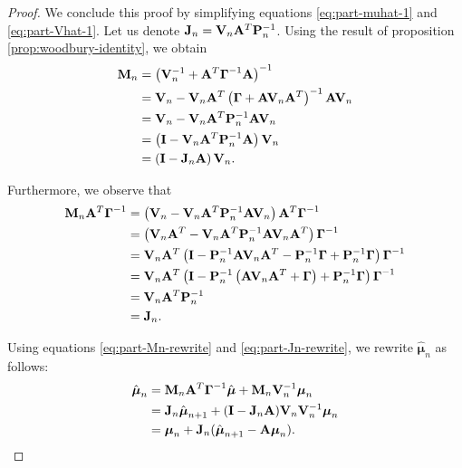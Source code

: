 \documentclass[11pt]{article}
\numberwithin{equation}{section}
\begin{document}
\begin{proof}
	We conclude this proof by simplifying equations \eqref{eq:part-muhat-1} and \eqref{eq:part-Vhat-1}.  Let us denote ${\bf J}_n = {\bf V}_n{\bf A}^T{\bf P}_n^{-1}$. Using the result of proposition \ref{prop:woodbury-identity}, we obtain
	\begin{align}
		{\bf M}_n 
			&= \left({\bf V}_n^{-1} + {\bf A}^T \boldsymbol\Gamma^{-1} {\bf A}\right)^{-1}\\
			&= {\bf V}_n - {\bf V}_n{\bf A}^T\left(\boldsymbol\Gamma + {\bf A}{\bf V}_n {\bf A}^T\right)^{-1}{\bf A}{\bf V}_n\\
			&= {\bf V}_n - {\bf V}_n{\bf A}^T{\bf P}_n^{-1}{\bf A}{\bf V}_n\\
			&= \left({\bf I} - {\bf V}_n{\bf A}^T{\bf P}_n^{-1}{\bf A}\right){\bf V}_n\\
			&= \left({\bf I} - {\bf J}_n{\bf A}\right){\bf V}_n. \label{eq:part-Mn-rewrite}
	\end{align}
	
	Furthermore, we observe that
	\begin{align}
		{\bf M}_n {\bf A}^T \boldsymbol{\Gamma}^{-1}
		&= \left({\bf V}_n - {\bf V}_n{\bf A}^T{\bf P}_n^{-1}{\bf A}{\bf V}_n\right){\bf A}^T\boldsymbol\Gamma^{-1}\\
		&= \left({\bf V}_n{\bf A}^T - {\bf V}_n{\bf A}^T{\bf P}_n^{-1}{\bf A}{\bf V}_n{\bf A}^T\right)\boldsymbol\Gamma^{-1}\\
		&= {\bf V}_n{\bf A}^T\left({\bf I} - {\bf P}_n^{-1}{\bf A}{\bf V}_n{\bf A}^T - {\bf P}_n^{-1}\boldsymbol{\Gamma} + {\bf P}_n^{-1}\boldsymbol{\Gamma}\right)\boldsymbol\Gamma^{-1}\\
		&= {\bf V}_n{\bf A}^T\left({\bf I} - {\bf P}_n^{-1}\left({\bf A}{\bf V}_n{\bf A}^T + \boldsymbol\Gamma\right) + {\bf P}_n^{-1}\boldsymbol{\Gamma}\right)\boldsymbol\Gamma^{-1}\\
		&= {\bf V}_n{\bf A}^T {\bf P}_n^{-1}\\
		&= {\bf J}_n. \label{eq:part-Jn-rewrite}
	\end{align}

	Using equations \eqref{eq:part-Mn-rewrite} and \eqref{eq:part-Jn-rewrite}, we rewrite $\hat{\boldsymbol{\mu}}_n$ as follows:
	\begin{align}
		\hat{\boldsymbol{\mu}}_n 
		&= {\bf M}_n {\bf A}^T \boldsymbol\Gamma ^{-1} \hat{\boldsymbol{\mu}} + {\bf M}_n {\bf V}_n^{-1} \boldsymbol\mu_n\\
		&= {\bf J}_n \hat{\boldsymbol{\mu}}_{n+1} + ({\bf I} - {\bf J}_n {\bf A}){\bf V}_n{\bf V}_n^{-1}\boldsymbol{\mu}_n\\
		&= \boldsymbol{\mu}_n + {\bf J}_n(\hat{\boldsymbol{\mu}}_{n+1} - {\bf A}\boldsymbol\mu_n).
	\end{align}
	

\end{proof}
\end{document}
